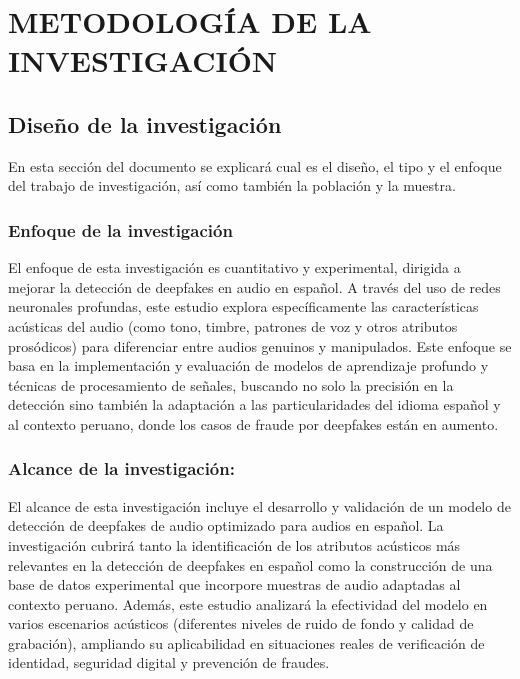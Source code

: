 \chapter{METODOLOGÍA DE LA INVESTIGACIÓN}
\section{Diseño de la investigación}
En esta sección del documento se explicará cual es el diseño, el tipo y el enfoque del trabajo de investigación, así como también la población y la muestra. 
\subsection{Enfoque de la investigación}
El enfoque de esta investigación es cuantitativo y experimental, dirigida a mejorar la detección de deepfakes en audio en español. A través del uso de redes neuronales profundas, este estudio explora específicamente las características acústicas del audio (como tono, timbre, patrones de voz y otros atributos prosódicos) para diferenciar entre audios genuinos y manipulados. Este enfoque se basa en la implementación y evaluación de modelos de aprendizaje profundo y técnicas de procesamiento de señales, buscando no solo la precisión en la detección sino también la adaptación a las particularidades del idioma español y al contexto peruano, donde los casos de fraude por deepfakes están en aumento. 

\subsection{Alcance de la investigación:}
El alcance de esta investigación incluye el desarrollo y validación de un modelo de detección de deepfakes de audio optimizado para audios en español. La investigación cubrirá tanto la identificación de los atributos acústicos más relevantes en la detección de deepfakes en español como la construcción de una base de datos experimental que incorpore muestras de audio adaptadas al contexto peruano. Además, este estudio analizará la efectividad del modelo en varios escenarios acústicos (diferentes niveles de ruido de fondo y calidad de grabación), ampliando su aplicabilidad en situaciones reales de verificación de identidad, seguridad digital y prevención de fraudes.

